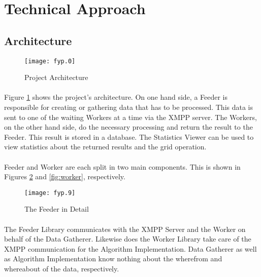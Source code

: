 \section{Technical Approach}

\subsection{Architecture}

\begin{figure}[H]
\begin{center}
\texttt{[image: fyp.0]}
\end{center}
\caption{Project Architecture}
\label{fig:architecture}
\end{figure}

\paragraph{}
Figure \ref{fig:architecture} shows the project's architecture. On one hand side, a Feeder is responsible for creating or gathering data that has to be processed. This data is sent to one of the waiting Workers at a time via the XMPP server. The Workers, on the other hand side, do the necessary processing and return the result to the Feeder. This result is stored in a database. The Statistics Viewer can be used to view statistics about the returned results and the grid operation.

\paragraph{}
Feeder and Worker are each split in two main components. This is shown in Figures \ref{fig:feeder} and \ref{fig:worker}, respectively.

\begin{figure}[H]
\begin{center}
\texttt{[image: fyp.9]}
\end{center}
\caption{The Feeder in Detail}
\label{fig:feeder}
\end{figure}

\paragraph{}
The Feeder Library communicates with the XMPP Server and the Worker on behalf of the Data Gatherer. Likewise does the Worker Library take care of the XMPP communication for the Algorithm Implementation. Data Gatherer as well as Algorithm Implementation know nothing about the wherefrom and whereabout of the data, respectively.


